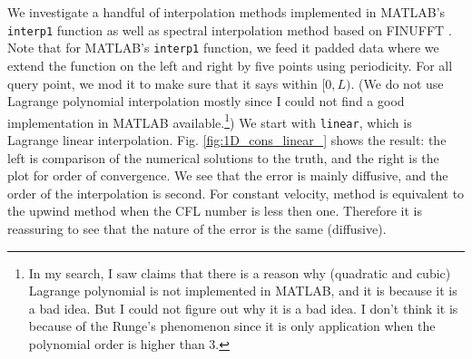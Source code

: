 \documentclass[11pt,letterpaper]{article}
\begin{document}
We investigate a handful of interpolation methods implemented in MATLAB's \texttt{interp1} function as well as spectral interpolation method based on FINUFFT \cite{finufft_1,finufft_2}. Note that for MATLAB's \texttt{interp1} function, we feed it padded data where we extend the function on the left and right by five points using periodicity. For all query point, we mod it to make sure that it says within $[0,L)$. (We do not use Lagrange polynomial interpolation mostly since I could not find a good implementation in MATLAB available.\footnote{In my search, I saw claims that there is a reason why (quadratic and cubic) Lagrange polynomial is not implemented in MATLAB, and it is because it is a bad idea. But I could not figure out why it is a bad idea. I don't think it is because of the Runge's phenomenon since it is only application when the polynomial order is higher than 3.}) We start with \texttt{linear}, which is Lagrange linear interpolation. Fig. \ref{fig:1D_cons_linear_} shows the result: the left is comparison of the numerical solutions to the truth, and the right is the plot for order of convergence. We see that the error is mainly diffusive, and the order of the interpolation is second. For constant velocity, \sml\;method is equivalent to the upwind method when the CFL number is less then one. Therefore it is reassuring to see that the nature of the error is the same (diffusive).
\end{document}
